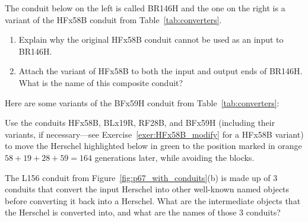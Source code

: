 \begin{multicols}{2}
\begin{problem}
	\end{problem}
	
	
	\mfilbreak
	
	
	\begin{problemstar}\label{exer:HFx58B_modify} 
		The conduit below on the left is called BR146H and the one on the right is a variant of the HFx58B conduit from Table~\ref{tab:converters}.
		
		\begin{center}
			 \qquad {}
		\end{center}
		
		\begin{enumerate}[label=\bf\color{ocre}(\alph*)]
			\item Explain why the original HFx58B conduit cannot be used as an input to BR146H.
			
			\item Attach the variant of HFx58B to both the input and output ends of BR146H. What is the name of this composite conduit?
		\end{enumerate}
	\end{problemstar}
	
	
	\mfilbreak
	
	
	\begin{problemstar}\label{exer:herschel_variants} 
		Here are some variants of the BFx59H conduit from Table~\ref{tab:converters}:
		\begin{center}
		\end{center}
		Use the conduits HFx58B, BLx19R, RF28B, and BFx59H (including their variants, if necessary---see Exercise~\ref{exer:HFx58B_modify} for a HFx58B variant) to move the Herschel highlighted below in green to the position marked in orange $58+19+28+59=164$ generations later, while avoiding the blocks.	
		\begin{center}
		\end{center}
	\end{problemstar}
	
	
	\mfilbreak
	
	
	\begin{problemstar}\label{exer:l156_break_apart} 
		The L156 conduit from Figure~\ref{fig:p67_with_conduits}(b) is made up of $3$ conduits that convert the input Herschel into other well-known named objects before converting it back into a Herschel. What are the intermediate objects that the Herschel is converted into, and what are the names of those $3$ conduits?
	\end{problemstar}
	

\end{multicols}
